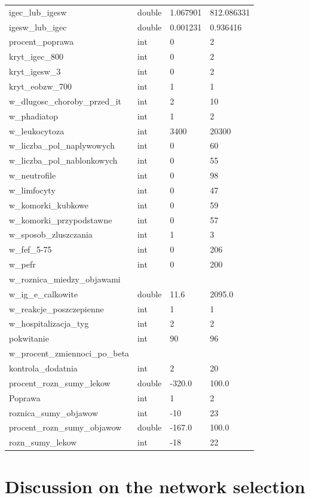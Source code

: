 \documentclass[10pt,oneside]{memoir}
\begin{document}
\begin{table}[htbp]
\begin{minipage}{\linewidth}
\begin{tabulary}{\linewidth}{@{}l@{}l@{}l@{}l@{}}
igec\_lub\_igesw&double&1.067901&812.086331 \\
igesw\_lub\_igec&double&0.001231&0.936416 \\
procent\_poprawa&int&0&2 \\
kryt\_igec\_800&int&0&2 \\
kryt\_igesw\_3&int&0&2 \\
kryt\_eobzw\_700&int&1&1 \\
w\_dlugosc\_choroby\_przed\_it&int&2&10 \\
w\_phadiatop&int&1&2 \\
w\_leukocytoza&int&3400&20300 \\
w\_liczba\_pol\_naplywowych&int&0&60 \\
w\_liczba\_pol\_nablonkowych&int&0&55 \\
w\_neutrofile&int&0&98 \\
w\_limfocyty&int&0&47 \\
w\_komorki\_kubkowe&int&0&59 \\
w\_komorki\_przypodstawne&int&0&57 \\
w\_sposob\_zluszczania&int&1&3 \\
w\_fef\_5-75&int&0&206 \\
w\_pefr&int&0&200 \\
w\_roznica\_miedzy\_objawami&&& \\
w\_ig\_e\_calkowite&double&11.6&2095.0 \\
w\_reakcje\_poszczepienne&int&1&1 \\
w\_hospitalizacja\_tyg&int&2&2 \\
pokwitanie&int&90&96 \\
w\_procent\_zmiennoci\_po\_beta&&& \\
kontrola\_dodatnia&int&2&20 \\
procent\_rozn\_sumy\_lekow&double&-320.0&100.0 \\
Poprawa&int&1&2 \\
roznica\_sumy\_objawow&int&-10&23 \\
procent\_rozn\_sumy\_objawow&double&-167.0&100.0 \\
rozn\_sumy\_lekow&int&-18&22 \\

		\bottomrule
	\end{tabulary}
\end{minipage}
\end{table}

\section{Discussion on the network selection}
\label{discussiononthenetworkselection}
\end{document}
